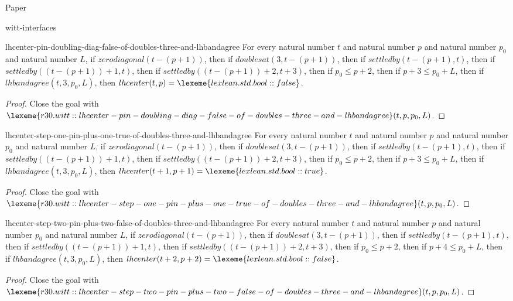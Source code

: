 \begin{lexlean}{Paper}
\begin{section}{witt-interfaces}
  \begin{theorem}{lhcenter-pin-doubling-diag-false-of-doubles-three-and-lhbandagree}
  For every natural number \(t\) and natural number \(p\) and natural number \(p_0\) and natural number \(L\), if \(zerodiagonal(t - (p + 1))\), then if \(doublesat(3, t - (p + 1))\), then if \(settledby(t - (p + 1), t)\), then if \(settledby((t - (p + 1)) + 1, t)\), then if \(settledby((t - (p + 1)) + 2, t + 3)\), then if \(p_0 ≤ p + 2\), then if \(p + 3 ≤ p_0 + L\), then if \(lhbandagree(t, 3, p_0, L)\), then \(lhcenter(t, p) = \lexeme{lexlean.std.bool::false}\).
  \begin{proof}
  Close the goal with \(\lexeme{r30.witt::lhcenter-pin-doubling-diag-false-of-doubles-three-and-lhbandagree}(t, p, p_0, L)\).
  \end{proof}
  \end{theorem}

  \begin{theorem}{lhcenter-step-one-pin-plus-one-true-of-doubles-three-and-lhbandagree}
  For every natural number \(t\) and natural number \(p\) and natural number \(p_0\) and natural number \(L\), if \(zerodiagonal(t - (p + 1))\), then if \(doublesat(3, t - (p + 1))\), then if \(settledby(t - (p + 1), t)\), then if \(settledby((t - (p + 1)) + 1, t)\), then if \(settledby((t - (p + 1)) + 2, t + 3)\), then if \(p_0 ≤ p + 2\), then if \(p + 3 ≤ p_0 + L\), then if \(lhbandagree(t, 3, p_0, L)\), then \(lhcenter(t + 1, p + 1) = \lexeme{lexlean.std.bool::true}\).
  \begin{proof}
  Close the goal with \(\lexeme{r30.witt::lhcenter-step-one-pin-plus-one-true-of-doubles-three-and-lhbandagree}(t, p, p_0, L)\).
  \end{proof}
  \end{theorem}

  \begin{theorem}{lhcenter-step-two-pin-plus-two-false-of-doubles-three-and-lhbandagree}
  For every natural number \(t\) and natural number \(p\) and natural number \(p_0\) and natural number \(L\), if \(zerodiagonal(t - (p + 1))\), then if \(doublesat(3, t - (p + 1))\), then if \(settledby(t - (p + 1), t)\), then if \(settledby((t - (p + 1)) + 1, t)\), then if \(settledby((t - (p + 1)) + 2, t + 3)\), then if \(p_0 ≤ p + 2\), then if \(p + 4 ≤ p_0 + L\), then if \(lhbandagree(t, 3, p_0, L)\), then \(lhcenter(t + 2, p + 2) = \lexeme{lexlean.std.bool::false}\).
  \begin{proof}
  Close the goal with \(\lexeme{r30.witt::lhcenter-step-two-pin-plus-two-false-of-doubles-three-and-lhbandagree}(t, p, p_0, L)\).
  \end{proof}
  \end{theorem}


\end{section}
\end{lexlean}
